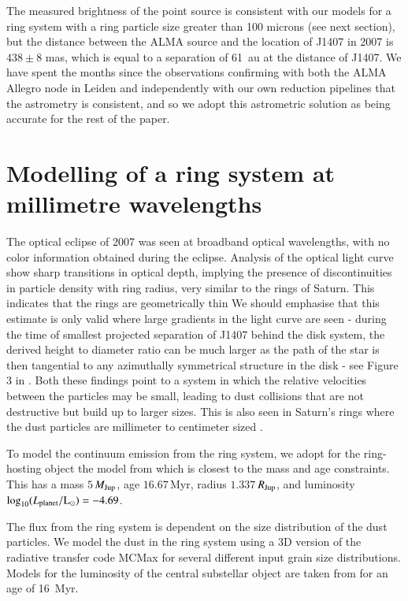 \documentclass[twocolumn]{aa} %
\newcommand\mjup{$M_{\rm Jup}$}
\newcommand\rjup{$R_{\rm Jup}$}
\begin{document}
The measured brightness of the point source is consistent with our models for a ring system with a ring particle size greater than 100 microns (see next section), but the distance between the ALMA source and the location of J1407 in 2007 is $438\pm 8$ mas, which is equal to a separation of 61~au at the distance of J1407.
%
We have spent the months since the observations confirming with both the ALMA Allegro node in Leiden and independently with our own reduction pipelines that the astrometry is consistent, and so we adopt this astrometric solution as being accurate for the rest of the paper.

\section{Modelling of a ring system at millimetre wavelengths} %

The optical eclipse of 2007 was seen at broadband optical wavelengths, with no color information obtained during the eclipse.
%
Analysis of the optical light curve show sharp transitions in optical depth, implying the presence of discontinuities in particle density with ring radius, very similar to the rings of Saturn.
%
This indicates that the rings are geometrically thin \citep[with a height to diameter ratio $h_{ring}/d_{ring}\approx 0.001$;][]{Mamajek12}
% 
We should emphasise that this estimate is only valid where large gradients in the light curve are seen - during the time of smallest projected separation of J1407 behind the disk system, the derived height to diameter ratio can be much larger as the path of the star is then tangential to any azimuthally symmetrical structure in the disk - see Figure 3 in \citet{Kenworthy15b}.
%
Both these findings point to a system in which the relative velocities between the particles may be small, leading to dust collisions that are not destructive but build up to larger sizes.
%
This is also seen in Saturn's rings where the dust particles are millimeter to centimeter sized \citep[e.g.,][]{Tiscareno13}.

To model the continuum emission from the ring system, we adopt for the ring-hosting object the model from \citet{Baraffe08} which is closest to the mass and age constraints.
%
This has a mass $5\,$\mjup, age $16.67\,$Myr, radius $1.337\,$\rjup, and luminosity $\log_{10}(L_{\rm planet}/{\rm L_{\odot}})=-4.69$.


The flux from the ring system is dependent on the size distribution of the dust particles.
%
We model the dust in the ring system using a 3D version of the radiative transfer code MCMax \citep{Min09} for several different input grain size distributions.
%
Models for the luminosity of the central substellar object are taken from \citet{Baraffe08} for an age of 16~Myr.
\end{document}
